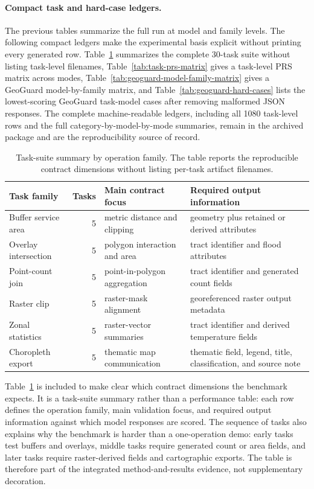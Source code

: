 \documentclass[12pt]{gsis}  %
\begin{document}
\paragraph{Compact task and hard-case ledgers.}

The previous tables summarize the full run at model and family levels. The following compact ledgers make the experimental basis explicit without printing every generated row. Table~\ref{tab:task-suite-summary} summarizes the complete 30-task suite without listing task-level filenames, Table~\ref{tab:task-prs-matrix} gives a task-level PRS matrix across modes, Table~\ref{tab:geoguard-model-family-matrix} gives a GeoGuard model-by-family matrix, and Table~\ref{tab:geoguard-hard-cases} lists the lowest-scoring GeoGuard task-model cases after removing malformed JSON responses. The complete machine-readable ledgers, including all 1080 task-level rows and the full category-by-model-by-mode summaries, remain in the archived package and are the reproducibility source of record.

\begin{table}[htbp]
\centering
\caption{Task-suite summary by operation family. The table reports the reproducible contract dimensions without listing per-task artifact filenames.}
\label{tab:task-suite-summary}
\small
\begin{tabular}{p{}rp{}p{}}
\toprule
Task family & Tasks & Main contract focus & Required output information \\
\midrule
Buffer service area & 5 & metric distance and clipping & geometry plus retained or derived attributes \\
Overlay intersection & 5 & polygon interaction and area & tract identifier and flood attributes \\
Point-count join & 5 & point-in-polygon aggregation & tract identifier and generated count fields \\
Raster clip & 5 & raster-mask alignment & georeferenced raster output metadata \\
Zonal statistics & 5 & raster-vector summaries & tract identifier and derived temperature fields \\
Choropleth export & 5 & thematic map communication & thematic field, legend, title, classification, and source note \\
\bottomrule
\end{tabular}
\end{table}

Table~\ref{tab:task-suite-summary} is included to make clear which contract dimensions the benchmark expects. It is a task-suite summary rather than a performance table: each row defines the operation family, main validation focus, and required output information against which model responses are scored. The sequence of tasks also explains why the benchmark is harder than a one-operation demo: early tasks test buffers and overlays, middle tasks require generated count or area fields, and later tasks require raster-derived fields and cartographic exports. The table is therefore part of the integrated method-and-results evidence, not supplementary decoration.
\end{document}
